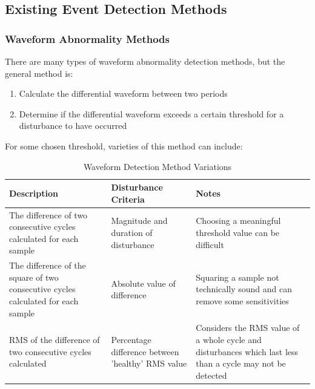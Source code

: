 \documentclass[12pt]{article}
\begin{document}
{\newpage
\subsection{Existing Event Detection Methods}
\subsubsection{Waveform Abnormality Methods}





There are many types of waveform abnormality detection methods, but the general method is:
\begin{enumerate}
\item Calculate the differential waveform between two periods
\item Determine if the differential waveform exceeds a certain threshold for a disturbance to have occurred
\end{enumerate}
For some chosen threshold, varieties of this method can include:

\begin{table}[H]
\centering
\begin{tabular}{|>{\RaggedRight}p{}|>{\RaggedRight}p{}|>{\RaggedRight}p{}|}
\hline
Description & Disturbance Criteria & Notes\\
\hline
The difference of two consecutive cycles calculated for each sample & Magnitude and duration of disturbance & Choosing a meaningful threshold value can be difficult\\
\hline
The difference of the square of two consecutive cycles calculated for each sample & Absolute value of difference & Squaring a sample not technically sound and can remove some sensitivities\\
\hline
RMS of the difference of two consecutive cycles calculated & Percentage difference between 'healthy' RMS value & Considers the RMS value of a whole cycle and disturbances which last less than a cycle may not be detected\\
\hline
\end{tabular}
\caption{Waveform Detection Method Variations}
\end{table}

}
\end{document}
